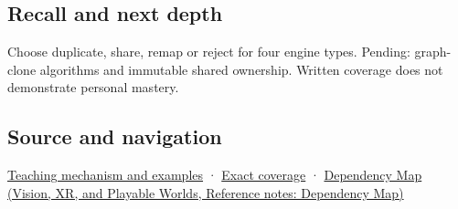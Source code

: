 \subsection{Recall and next depth}\label{appendix-1340cd1ce582-recall-and-next-depth}

Choose duplicate, share, remap or reject for four engine types. Pending: graph-clone algorithms and immutable shared ownership. Written coverage does not demonstrate personal mastery.

\subsection{Source and navigation}\label{appendix-1340cd1ce582-source-and-navigation}

\hyperref[01-foundations-i-ch003-copy-a-meaning-rather-than-just-its-bytes]{Teaching mechanism and examples} · \hyperref[appendix-fd090d982a15-m009---parts-127-147]{Exact coverage} · \href{../07-Vision-XR-and-Playable-Worlds/main.pdf\#nameddest=appendix-4ad47bdd269a}{Dependency Map (Vision, XR, and Playable Worlds, Reference notes: Dependency Map)}
